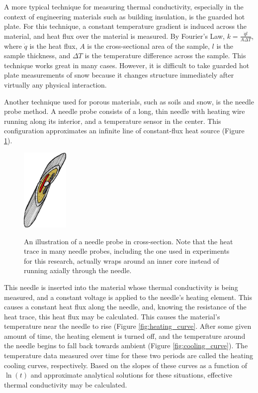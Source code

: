 A more typical technique for measuring thermal conductivity, especially in the
context of engineering materials such as building insulation, is the guarded
hot plate. For this technique, a constant temperature gradient is induced across
the material, and heat flux over the material is measured.  By Fourier's Law,
\(k = \frac{\dot{q}l}{A\Delta T}\), where \(\dot{q}\) is the heat flux, \(A\) is
the cross-sectional area of the sample, \(l\) is the sample thickness, and 
\(\Delta T\) is the temperature difference across the sample. This technique
works great in many cases. However, it is difficult to take guarded hot plate
measurements of snow because it changes structure immediately after virtually
any physical interaction.

Another technique used for porous materials, such as soils and snow, is the
needle probe method. A needle probe consists of a long, thin needle with heating
wire running along its interior, and a temperature sensor in the center. This
configuration approximates an infinite line of constant-flux heat source
(Figure \ref{fig:needle_xsect}).

\begin{figure}[h]
\centering
\includegraphics[width=0.2\textwidth]{fig/needle_xsect.png}
\label{fig:needle_xsect}
\caption{An illustration of a needle probe in cross-section. Note that the heat
trace in many needle probes, including the one used in experiments for this
research, actually wraps around an inner core instead of running axially through
the needle.}
\end{figure}

This needle is inserted into the material whose thermal conductivity is being
measured, and a constant voltage is applied to the needle's heating element.
This causes a constant heat flux along the needle, and, knowing the resistance
of the heat trace, this heat flux may be calculated. This causes the material's
temperature near the needle to rise (Figure \ref{fig:heating_curve}. After some
given amount of time, the heating element is turned off, and the temperature
around the needle begins to fall back towards ambient (Figure \ref{fig:cooling_curve}).
The temperature data measured over time for these two periods are called the
heating cooling curves, respectively.  Based on the slopes of these
curves as a function of \(\ln(t)\) and approximate analytical solutions for
these situations, effective thermal conductivity may be calculated.

